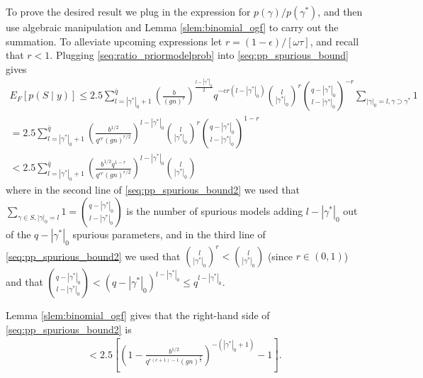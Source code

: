 To prove the desired result we plug in the expression for $p(\gamma)/p(\gamma^*)$, and then use algebraic manipulation and Lemma \ref{slem:binomial_ogf} to carry out the summation. 
To alleviate upcoming expressions let $r= (1-\epsilon)/[\omega \tau]$, and recall that $r<1$.
Plugging \eqref{seq:ratio_priormodelprob} into \eqref{seq:pp_spurious_bound} gives
\begin{align}
  E_F[p(S \mid y)] \leq 2.5 \sum_{l=|\gamma^*|_0+1}^{\bar{q}} 
\left( \frac{b}{(g n)^{r}} \right)^{\frac{l - |\gamma^*|_0}{2}} 
q^{-cr(l - |\gamma^*|_0)} {l \choose |\gamma^*|_0 }^{r} {q - |\gamma^*|_0 \choose l - |\gamma^*|_0}^{-r}
\sum_{|\gamma|_0=l, \gamma \supset \gamma^*}  1
\nonumber \\
= 2.5 \sum_{l=|\gamma^*|_0+1}^{\bar{q}} 
\left( \frac{b^{1/2}}{q^{cr} (g n)^{r/2}} \right)^{l - |\gamma^*|_0}
{l \choose |\gamma^*|_0 }^r {q - |\gamma^*|_0 \choose l - |\gamma^*|_0}^{1-r}
\nonumber \\
<
2.5 \sum_{l=|\gamma^*|_0+1}^{\bar{q}} 
\left( \frac{b^{1/2} q^{1-r}}{q^{cr} (g n)^{r/2}} \right)^{l - |\gamma^*|_0}
{l \choose |\gamma^*|_0 } 
\label{seq:pp_spurious_bound2}
\end{align}
where in the second line of \eqref{seq:pp_spurious_bound2} we used that $\sum_{\gamma \in S, |\gamma|_0=l}  1= {q - |\gamma^*|_0 \choose l - |\gamma^*|_0}$ is the number of spurious models adding $l - |\gamma^*|_0$ out of the $q - |\gamma^*|_0$ spurious parameters,
and in the third line of \eqref{seq:pp_spurious_bound2} we used that
${l \choose |\gamma^*|_0}^r < {l \choose |\gamma^*|_0}$ (since $r \in (0,1)$) and that
${q - |\gamma^*|_0 \choose l - |\gamma^*|_0}  < (q-|\gamma^*|_0)^{l - |\gamma^*|_0} \leq q^{l - |\gamma^*|_0}$.

Lemma \ref{slem:binomial_ogf} gives that the right-hand side of \eqref{seq:pp_spurious_bound2} is
\begin{align}
< 2.5
\left[ \left(1 - \frac{b^{1/2}}{q^{r(c + 1) -1} (g n)^{\frac{r}{2}}} \right)^{-(|\gamma^*|_0 +1)} - 1 \right].
\label{seq:pp_spurious_bound3}
\end{align}

